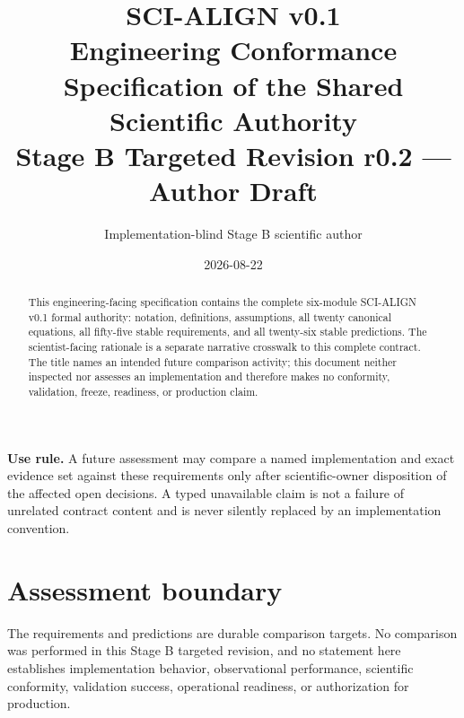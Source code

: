 \documentclass[10pt]{article}
\title{SCI-ALIGN v0.1\\
\large Engineering Conformance Specification of the Shared Scientific Authority\\
\normalsize Stage B Targeted Revision r0.2 --- Author Draft}
\author{Implementation-blind Stage B scientific author}
\date{2026-08-22}
\begin{document}
\maketitle

\begin{abstract}
This engineering-facing specification contains the complete six-module
SCI-ALIGN v0.1 formal authority: notation, definitions, assumptions, all
twenty canonical equations, all fifty-five stable requirements, and all
twenty-six stable predictions.  The scientist-facing rationale is a separate
narrative crosswalk to this complete contract.  The title names an intended
future comparison activity; this document neither inspected nor assesses an
implementation and therefore makes no conformity, validation, freeze,
readiness, or production claim.
\end{abstract}

\noindent\textbf{Use rule.} A future assessment may compare a named
implementation and exact evidence set against these requirements only after
scientific-owner disposition of the affected open decisions.  A typed
unavailable claim is not a failure of unrelated contract content and is never
silently replaced by an implementation convention.

\tableofcontents








\section*{Assessment boundary}
The requirements and predictions are durable comparison targets.  No
comparison was performed in this Stage B targeted revision, and no statement here establishes
implementation behavior, observational performance, scientific conformity,
validation success, operational readiness, or authorization for production.
\end{document}
